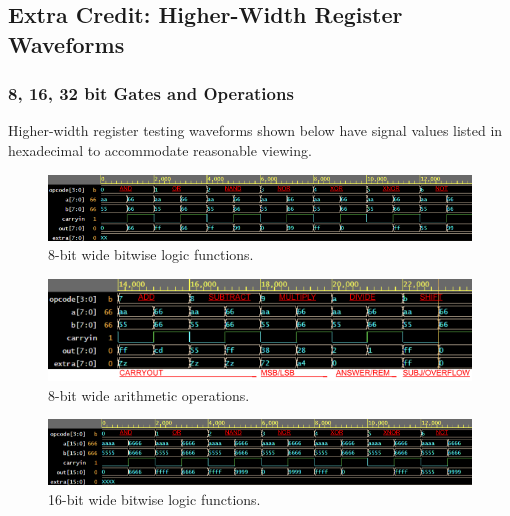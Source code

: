 \documentclass[12pt]{article}
\begin{document}
\subsection{Extra Credit: Higher-Width Register Waveforms}

    
\subsubsection{8, 16, 32 bit Gates and Operations}
Higher-width register testing waveforms shown below have signal values listed in hexadecimal to accommodate reasonable viewing.
     \begin{figure}[H]
        \centering
        \includegraphics[width = 1.0\textwidth]{figs/CompArch Final Test Cases 8x labeled GATES (resized).png}
        \caption{8-bit wide bitwise logic functions.}
        \label{fig:enter-label}
    \end{figure}
    
   \begin{figure}[H]
        \centering
        \includegraphics[width = 1.0\textwidth]{figs/CompArch Final Test Cases 8x labeled OPERATIONS (resized).png}
        \caption{8-bit wide arithmetic operations.}
        \label{fig:enter-label}
    \end{figure}


    \begin{figure}[H]
        \centering
        \includegraphics[width = 1.0\textwidth]{figs/CompArch Final Test Cases 16x labeled GATES (resized).png}
        \caption{16-bit wide bitwise logic functions.}
        \label{fig:enter-label}
    \end{figure}
\end{document}
